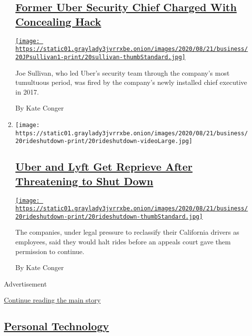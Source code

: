\begin{enumerate}
  \hypertarget{former-uber-security-chief-charged-with-concealing-hack}{%
  \subsection{\texorpdfstring{\href{/2020/08/20/technology/joe-sullivan-uber-charged-hack.html}{Former
  Uber Security Chief Charged With Concealing
  Hack}}{Former Uber Security Chief Charged With Concealing Hack}}\label{former-uber-security-chief-charged-with-concealing-hack}}

  \href{/2020/08/20/technology/joe-sullivan-uber-charged-hack.html}{\texttt{[image: https://static01.graylady3jvrrxbe.onion/images/2020/08/21/business/20JPsullivan1-print/20sullivan-thumbStandard.jpg]}}

  Joe Sullivan, who led Uber's security team through the company's most
  tumultuous period, was fired by the company's newly installed chief
  executive in 2017.

  By Kate Conger
\item
  \texttt{[image: https://static01.graylady3jvrrxbe.onion/images/2020/08/21/business/20rideshutdown-print/20rideshutdown-videoLarge.jpg]}

  \hypertarget{uber-and-lyft-get-reprieve-after-threatening-to-shut-down}{%
  \subsection{\texorpdfstring{\href{/2020/08/20/technology/uber-lyft-california-shutdown.html}{Uber
  and Lyft Get Reprieve After Threatening to Shut
  Down}}{Uber and Lyft Get Reprieve After Threatening to Shut Down}}\label{uber-and-lyft-get-reprieve-after-threatening-to-shut-down}}

  \href{/2020/08/20/technology/uber-lyft-california-shutdown.html}{\texttt{[image: https://static01.graylady3jvrrxbe.onion/images/2020/08/21/business/20rideshutdown-print/20rideshutdown-thumbStandard.jpg]}}

  The companies, under legal pressure to reclassify their California
  drivers as employees, said they would halt rides before an appeals
  court gave them permission to continue.

  By Kate Conger
\end{enumerate}

Advertisement

\protect\hyperlink{after-mid1}{Continue reading the main story}

\hypertarget{personal-technology}{%
\subsection{\texorpdfstring{\href{/section/technology/personaltech}{Personal
Technology}}{Personal Technology}}\label{personal-technology}}

